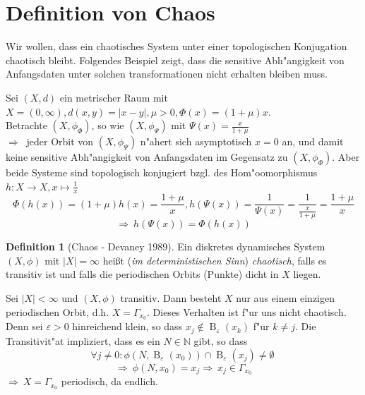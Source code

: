 \documentclass[a4paper, 13pt]{scrreprt}
\theoremstyle{definition} \newtheorem{definition}{Definition}[section]
\newenvironment{beispiel}[1][Beispiel]{\begin{trivlist}
\item[\hskip \labelsep {\bfseries #1}]}{\end{trivlist}}
\newenvironment{bemerkung}[1][Bemerkung]{\begin{trivlist}
\item[\hskip \labelsep {\bfseries #1}]}{\end{trivlist}}
\begin{document}
\section{Definition von Chaos}
Wir wollen, dass ein chaotisches System unter einer topologischen Konjugation chaotisch bleibt. Folgendes Beispiel zeigt, dass die sensitive Abh"angigkeit von Anfangsdaten unter solchen transformationen nicht erhalten bleiben muss.
\begin{beispiel}
Sei $(X,d)$ ein metrischer Raum mit $X=(0,\infty), d(x,y)=|x-y|, \mu>0, \Phi(x)=(1+\mu)x$.\\
Betrachte $(X,\phi_\Phi)$, so wie $(X,\phi_\Psi)$ mit $\Psi(x)=\frac x {1+\mu}$\\
$\Rightarrow\ $ jeder Orbit von $(X,\phi_\Psi)$ n"ahert sich asymptotisch $x=0$ an, und damit keine sensitive Abh"angigkeit von Anfangsdaten im Gegensatz zu $(X,\phi_\Phi)$. Aber beide Systeme sind topologisch konjugiert bzgl. des Hom"oomorphismus $h:X\rightarrow X, x\mapsto \frac 1 x$
\[\Phi(h(x))=(1+\mu)h(x)=\frac{1+\mu} x, h(\Psi(x))=\frac 1 {\Psi(x)}=\frac 1 {\frac x {1+\mu}} =\frac{1+\mu} x\]
\[\Rightarrow\ h(\Psi(x))=\Phi(h(x))\]
\end{beispiel}

\begin{definition}[Chaos - Devaney 1989]
Ein diskretes dynamisches System $(X,\phi)$ mit $|X| = \infty$ heißt (\emph{im deterministischen Sinn}) \emph{chaotisch}, falls es transitiv ist und falls die periodischen Orbits (Punkte) dicht in $X$ liegen.
\end{definition}

\begin{bemerkung}
Sei $|X|<\infty$ und $(X,\phi)$ transitiv. Dann besteht $X$ nur aus einem einzigen periodischen Orbit, d.h. $X=\Gamma_{x_0}$. Dieses Verhalten ist f"ur uns nicht chaotisch. Denn sei $\varepsilon > 0$ hinreichend klein, so dass $x_j\notin\operatorname{B}_{\varepsilon}(x_k)$ f"ur $k\neq j$.
Die Transitivit"at impliziert, dass es ein $N\in\mathbb{N}$ gibt, so dass
\[\forall j\neq 0: \phi(N, \operatorname{B}_{\varepsilon}(x_0))\cap \operatorname{B}_{\varepsilon}(x_j)\neq\emptyset\ \]
\[\Rightarrow\ \phi(N, x_0)=x_j \Rightarrow\ x_j\in\Gamma_{x_0}\]
$\Rightarrow\ X=\Gamma_{x_0}$ periodisch, da endlich.
\end{bemerkung}
\end{document}
